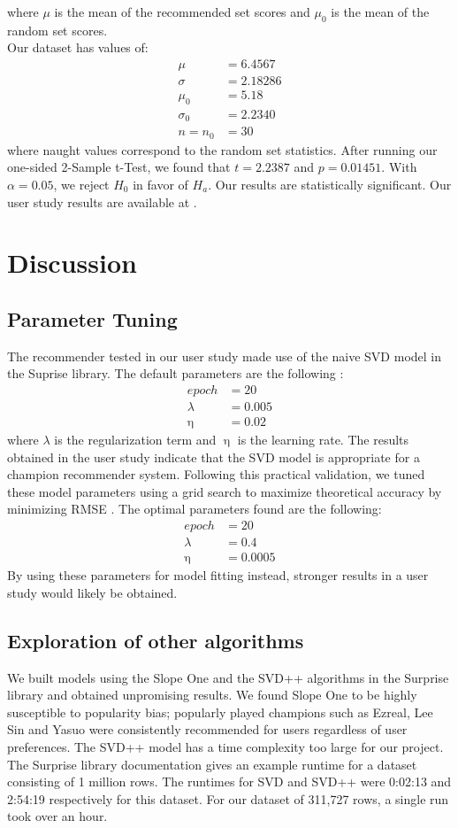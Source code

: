 \documentclass [11pt]{IEEEtran}
\begin{document}
where $\mu$ is the mean of the recommended set scores and $\mu_{0}$ is the mean of the random set scores. \\
Our dataset has values of: 
\begin{align*}
\mu& = 6.4567 \\
\sigma& = 2.18286 \\
\mu_{0}& = 5.18 \\
\sigma_{0}& = 2.2340 \\
n = n_{0}& = 30
\end{align*}
where naught values correspond to the random set statistics.
After running our one-sided 2-Sample t-Test, we found that $t=2.2387$ and $p=0.01451$. With $ \alpha = 0.05$, we reject $H_0$ in favor of $H_a$. Our results are statistically significant. Our user study results are available at \cite{github}. 

\section{Discussion}
\subsection{Parameter Tuning}
The recommender tested in our user study made use of the naive SVD model in the Suprise library. 
The default parameters are the following \cite{Surprise}: 
\begin{align*}
    epoch& = 20 \\
    \lambda&  = 0.005 \\
    \upeta& = 0.02
\end{align*}
where $\lambda$ is the regularization term and $\upeta$ is the learning rate.
The results obtained in the user study indicate that the SVD model is appropriate for a champion recommender system. 
Following this practical validation, we tuned these model parameters using a grid search to maximize theoretical accuracy by minimizing RMSE \cite{Surprise}. 
The optimal parameters found are the following:
\begin{align*}
    epoch& = 20 \\
    \lambda& = 0.4 \\
    \upeta& = 0.0005
\end{align*}
By using these parameters for model fitting instead, stronger results in a user study would likely be obtained. 

\subsection{Exploration of other algorithms}
We built models using the Slope One \cite{lemire2005slope} and the SVD++ algorithms in the Surprise library and obtained unpromising results.
We found Slope One to be highly susceptible to popularity bias; popularly played champions such as Ezreal, Lee Sin and Yasuo were consistently recommended for users regardless of user preferences. 
The SVD++ model has a time complexity too large for our project. 
The Surprise library documentation gives an example runtime for a dataset consisting of 1 million rows. 
The runtimes for SVD and SVD++ were 0:02:13 and 2:54:19 \cite{Surprise} respectively for this dataset. 
For our dataset of 311,727 rows, a single run took over an hour.
\end{document}
